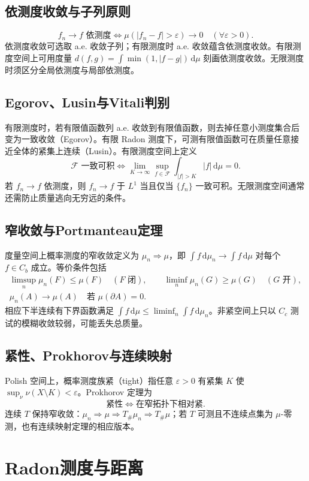 \documentclass[../main.tex]{subfiles}
\begin{document}
\subsection{依测度收敛与子列原则}
\[
f_n\to f\text{ 依测度}\iff\mu(|f_n-f|>\varepsilon)\to0\quad(\forall\varepsilon>0).
\]
依测度收敛可选取 a.e. 收敛子列；有限测度时 a.e. 收敛蕴含依测度收敛。有限测度空间上可用度量 $d(f,g)=\int\min(1,|f-g|)\,\mathrm d\mu$ 刻画依测度收敛。无限测度时须区分全局依测度与局部依测度。
\subsection{Egorov、Lusin与Vitali判别}
有限测度时，若有限值函数列 a.e. 收敛到有限值函数，则去掉任意小测度集合后变为一致收敛（Egorov）。有限 Radon 测度下，可测有限值函数可在质量任意接近全体的紧集上连续（Lusin）。有限测度空间上定义
\[
\mathcal F\text{ 一致可积}\iff
\lim_{K\to\infty}\sup_{f\in\mathcal F}\int_{|f|>K}|f|\,\mathrm d\mu=0.
\]
若 $f_n\to f$ 依测度，则 $f_n\to f$ 于 $L^1$ 当且仅当 $\{f_n\}$ 一致可积。无限测度空间通常还需防止质量逃向无穷远的条件。
\subsection{窄收敛与Portmanteau定理}
度量空间上概率测度的窄收敛定义为 $\mu_n\Rightarrow\mu$，即 $\int f\,\mathrm d\mu_n\to\int f\,\mathrm d\mu$ 对每个 $f\in C_b$ 成立。等价条件包括
\begin{gather*}
\limsup_n\mu_n(F)\le\mu(F)\quad(F\text{ 闭}),\qquad
\liminf_n\mu_n(G)\ge\mu(G)\quad(G\text{ 开}),\\
\mu_n(A)\to\mu(A)\quad\text{若 }\mu(\partial A)=0.
\end{gather*}
相应下半连续有下界函数满足 $\int f\,\mathrm d\mu\le\liminf_n\int f\,\mathrm d\mu_n$。非紧空间上只以 $C_c$ 测试的模糊收敛较弱，可能丢失总质量。
\subsection{紧性、Prokhorov与连续映射}
Polish 空间上，概率测度族紧（tight）指任意 $\varepsilon>0$ 有紧集 $K$ 使 $\sup_\nu\nu(X\setminus K)<\varepsilon$。Prokhorov 定理为
\[
\text{紧性}\iff\text{在窄拓扑下相对紧}.
\]
连续 $T$ 保持窄收敛：$\mu_n\Rightarrow\mu\Rightarrow T_\#\mu_n\Rightarrow T_\#\mu$；若 $T$ 可测且不连续点集为 $\mu$-零测，也有连续映射定理的相应版本。
\section{Radon测度与距离}
\end{document}
